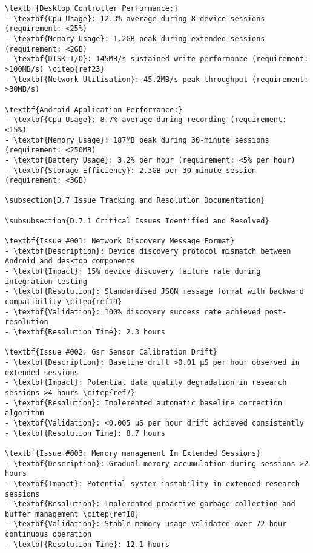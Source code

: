 \begin{verbatim}
\textbf{Desktop Controller Performance:}
- \textbf{Cpu Usage}: 12.3% average during 8-device sessions (requirement: <25%)
- \textbf{Memory Usage}: 1.2GB peak during extended sessions (requirement: <2GB)
- \textbf{DISK I/O}: 145MB/s sustained write performance (requirement: >100MB/s) \citep{ref23}
- \textbf{Network Utilisation}: 45.2MB/s peak throughput (requirement: >30MB/s)

\textbf{Android Application Performance:}
- \textbf{Cpu Usage}: 8.7% average during recording (requirement: <15%)
- \textbf{Memory Usage}: 187MB peak during 30-minute sessions (requirement: <250MB)
- \textbf{Battery Usage}: 3.2% per hour (requirement: <5% per hour)
- \textbf{Storage Efficiency}: 2.3GB per 30-minute session (requirement: <3GB)

\subsection{D.7 Issue Tracking and Resolution Documentation}

\subsubsection{D.7.1 Critical Issues Identified and Resolved}

\textbf{Issue #001: Network Discovery Message Format}
- \textbf{Description}: Device discovery protocol mismatch between Android and desktop components
- \textbf{Impact}: 15% device discovery failure rate during integration testing
- \textbf{Resolution}: Standardised JSON message format with backward compatibility \citep{ref19}
- \textbf{Validation}: 100% discovery success rate achieved post-resolution
- \textbf{Resolution Time}: 2.3 hours

\textbf{Issue #002: Gsr Sensor Calibration Drift}
- \textbf{Description}: Baseline drift >0.01 μS per hour observed in extended sessions
- \textbf{Impact}: Potential data quality degradation in research sessions >4 hours \citep{ref7}
- \textbf{Resolution}: Implemented automatic baseline correction algorithm
- \textbf{Validation}: <0.005 μS per hour drift achieved consistently
- \textbf{Resolution Time}: 8.7 hours

\textbf{Issue #003: Memory management In Extended Sessions}
- \textbf{Description}: Gradual memory accumulation during sessions >2 hours
- \textbf{Impact}: Potential system instability in extended research sessions
- \textbf{Resolution}: Implemented proactive garbage collection and buffer management \citep{ref18}
- \textbf{Validation}: Stable memory usage validated over 72-hour continuous operation
- \textbf{Resolution Time}: 12.1 hours


\end{verbatim}
